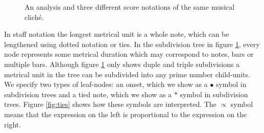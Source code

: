 \begin{figure}[t]
\centering
{}

\caption{An analysis and three different score notations of the same musical clich\'e. }
\label{fig:subdivision}
\end{figure}

In staff notation the longest metrical unit is a whole note, which can be lengthened using dotted notation or ties. In the subdivision tree in figure \ref{fig:subdivision}, every node represents some metrical duration which may correspond to notes, bars or multiple bars. Although figure \ref{fig:subdivision} only shows duple and triple subdivisions a metrical unit in the tree can be subdivided into any prime number child-units. We specify two types of leaf-nodes: an onset, which we show as a $\bullet$ symbol in subdivision trees and a tied note, which we show as a $*$ symbol in subdivision trees. Figure \ref{fig:ties} shows how these symbols are interpreted. The $\propto$ symbol means that the expression on the left is proportional to the expression on the right.

